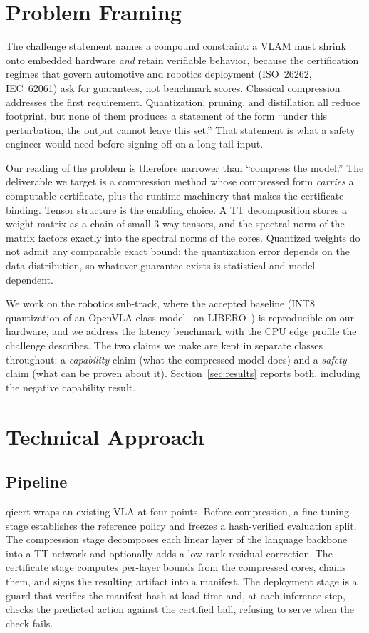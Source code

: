 \documentclass[conference,10pt]{IEEEtran}
\begin{document}
\section{Problem Framing}

The challenge statement names a compound constraint: a VLAM must shrink onto
embedded hardware \emph{and} retain verifiable behavior, because the
certification regimes that govern automotive and robotics deployment (ISO~26262,
IEC~62061) ask for guarantees, not benchmark scores. Classical compression
addresses the first requirement. Quantization, pruning, and distillation all
reduce footprint, but none of them produces a statement of the form ``under
this perturbation, the output cannot leave this set.'' That statement is what
a safety engineer would need before signing off on a long-tail input.

Our reading of the problem is therefore narrower than ``compress the model.''
The deliverable we target is a compression method whose compressed form
\emph{carries} a computable certificate, plus the runtime machinery that makes
the certificate binding. Tensor structure is the enabling choice. A TT
decomposition stores a weight matrix as a chain of small 3-way tensors, and
the spectral norm of the matrix factors exactly into the spectral norms of the
cores. Quantized weights do not admit any comparable exact bound: the
quantization error depends on the data distribution, so whatever guarantee
exists is statistical and model-dependent.

We work on the robotics sub-track, where the accepted baseline (INT8
quantization of an OpenVLA-class model~\cite{kim24} on LIBERO~\cite{liu23libero}) is reproducible on our
hardware, and we address the latency benchmark with the CPU edge profile the
challenge describes. The two claims we make are kept in separate classes
throughout: a \emph{capability} claim (what the compressed model does) and a
\emph{safety} claim (what can be proven about it). Section~\ref{sec:results}
reports both, including the negative capability result.

\section{Technical Approach}

\subsection{Pipeline}
qicert wraps an existing VLA at four points. Before compression, a
fine-tuning stage establishes the reference policy and freezes a
hash-verified evaluation split. The compression stage decomposes each linear
layer of the language backbone into a TT network and optionally adds a
low-rank residual correction. The certificate stage computes per-layer bounds
from the compressed cores, chains them, and signs the resulting artifact into
a manifest. The deployment stage is a guard that verifies the manifest hash at
load time and, at each inference step, checks the predicted action against the
certified ball, refusing to serve when the check fails.
\end{document}
